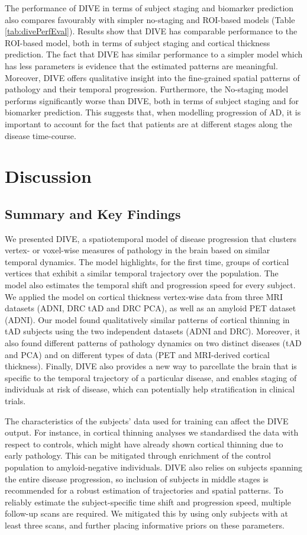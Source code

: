 The performance of DIVE in terms of subject staging and biomarker prediction also compares favourably with simpler no-staging and ROI-based models (Table \ref{tab:divePerfEval}). Results show that DIVE has comparable performance to the ROI-based model, both in terms of subject staging and cortical thickness prediction. The fact that DIVE has similar performance to a simpler model which has less parameters is evidence that the estimated patterns are meaningful. Moreover, DIVE offers qualitative insight into the fine-grained spatial patterns of pathology and their temporal progression. Furthermore, the No-staging model performs significantly worse than DIVE, both in terms of subject staging and for biomarker prediction. This suggests that, when modelling progression of AD, it is important to account for the fact that patients are at different stages along the disease time-course.


\section{Discussion}
\label{sec:diveDis}

\subsection{Summary and Key Findings}

We presented DIVE, a spatiotemporal model of disease progression that clusters vertex- or voxel-wise measures of pathology in the brain based on similar temporal dynamics. The model highlights, for the first time, groups of cortical vertices that exhibit a similar temporal trajectory over the population. The model also estimates the temporal shift and progression speed for every subject. We applied the model on cortical thickness vertex-wise data from three MRI datasets (ADNI, DRC tAD and DRC PCA), as well as an amyloid PET dataset (ADNI). Our model found qualitatively similar patterns of cortical thinning in tAD subjects using the two independent datasets (ADNI and DRC). Moreover, it also found different patterns of pathology dynamics on two distinct diseases (tAD and PCA) and on different types of data (PET and MRI-derived cortical thickness). Finally, DIVE also provides a new way to parcellate the brain that is specific to the temporal trajectory of a particular disease, and enables staging of individuals at risk of disease, which can potentially help stratification in clinical trials.

The characteristics of the subjects' data used for training can affect the DIVE output. For instance, in cortical thinning analyses we standardised the data with respect to controls, which might have already shown cortical thinning due to early pathology. This can be mitigated through enrichment of the control population to amyloid-negative individuals. DIVE also relies on subjects spanning the entire disease progression, so inclusion of subjects in middle stages is recommended for a robust estimation of trajectories and spatial patterns. To reliably estimate the subject-specific time shift and progression speed, multiple follow-up scans are required. We mitigated this by using only subjects with at least three scans, and further placing informative priors on these parameters. 

